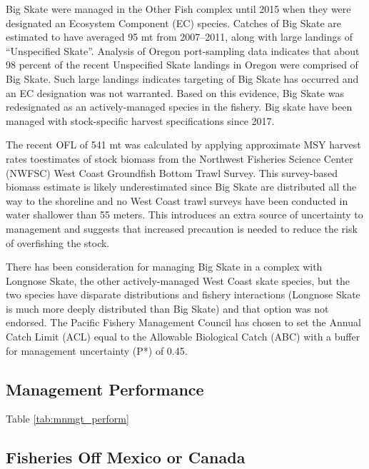 \documentclass[12pt,]{article}
\begin{document}
Big Skate were managed in the Other Fish complex until 2015 when they
were designated an Ecosystem Component (EC) species. Catches of Big
Skate are estimated to have averaged 95 mt from 2007--2011, along with
large landings of ``Unspecified Skate''. Analysis of Oregon
port-sampling data indicates that about 98 percent of the recent
Unspecified Skate landings in Oregon were comprised of Big Skate. Such
large landings indicates targeting of Big Skate has occurred and an EC
designation was not warranted. Based on this evidence, Big Skate was
redesignated as an actively-managed species in the fishery. Big skate
have been managed with stock-specific harvest specifications since 2017.

The recent OFL of 541 mt was calculated by applying approximate MSY
harvest rates toestimates of stock biomass from the Northwest Fisheries
Science Center (NWFSC) West Coast Groundfish Bottom Trawl Survey. This
survey-based biomass estimate is likely underestimated since Big Skate
are distributed all the way to the shoreline and no West Coast trawl
surveys have been conducted in water shallower than 55 meters. This
introduces an extra source of uncertainty to management and suggests
that increased precaution is needed to reduce the risk of overfishing
the stock.

There has been consideration for managing Big Skate in a complex with
Longnose Skate, the other actively-managed West Coast skate species, but
the two species have disparate distributions and fishery interactions
(Longnose Skate is much more deeply distributed than Big Skate) and that
option was not endorsed. The Pacific Fishery Management Council has
chosen to set the Annual Catch Limit (ACL) equal to the Allowable
Biological Catch (ABC) with a buffer for management uncertainty (P*) of
0.45.

\hypertarget{management-performance-1}{%
\subsection{Management Performance}\label{management-performance-1}}

Table \ref{tab:mnmgt_perform}

\hypertarget{fisheries-off-mexico-or-canada}{%
\subsection{Fisheries Off Mexico or
Canada}\label{fisheries-off-mexico-or-canada}}

\newpage
\end{document}
